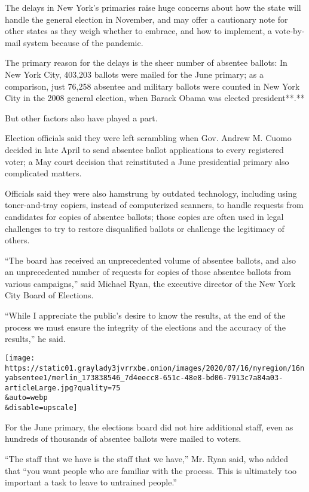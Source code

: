 The delays in New York's primaries raise huge concerns about how the
state will handle the general election in November, and may offer a
cautionary note for other states as they weigh whether to embrace, and
how to implement, a vote-by-mail system because of the pandemic.

The primary reason for the delays is the sheer number of absentee
ballots: In New York City, 403,203 ballots were mailed for the June
primary; as a comparison, just 76,258 absentee and military ballots were
counted in New York City in the 2008 general election, when Barack Obama
was elected president**.**

But other factors also have played a part.

Election officials said they were left scrambling when Gov. Andrew M.
Cuomo decided in late April to send absentee ballot applications to
every registered voter; a May court decision that reinstituted a June
presidential primary also complicated matters.

Officials said they were also hamstrung by outdated technology,
including using toner-and-tray copiers, instead of computerized
scanners, to handle requests from candidates for copies of absentee
ballots; those copies are often used in legal challenges to try to
restore disqualified ballots or challenge the legitimacy of others.

``The board has received an unprecedented volume of absentee ballots,
and also an unprecedented number of requests for copies of those
absentee ballots from various campaigns,'' said Michael Ryan, the
executive director of the New York City Board of Elections.

``While I appreciate the public's desire to know the results, at the end
of the process we must ensure the integrity of the elections and the
accuracy of the results,'' he said.

\texttt{[image: https://static01.graylady3jvrrxbe.onion/images/2020/07/16/nyregion/16nyabsentee1/merlin\_173838546\_7d4eecc8-651c-48e8-bd06-7913c7a84a03-articleLarge.jpg?quality=75\\\&auto=webp\\\&disable=upscale]}

For the June primary, the elections board did not hire additional staff,
even as hundreds of thousands of absentee ballots were mailed to voters.

``The staff that we have is the staff that we have,'' Mr. Ryan said, who
added that ``you want people who are familiar with the process. This is
ultimately too important a task to leave to untrained people.''

